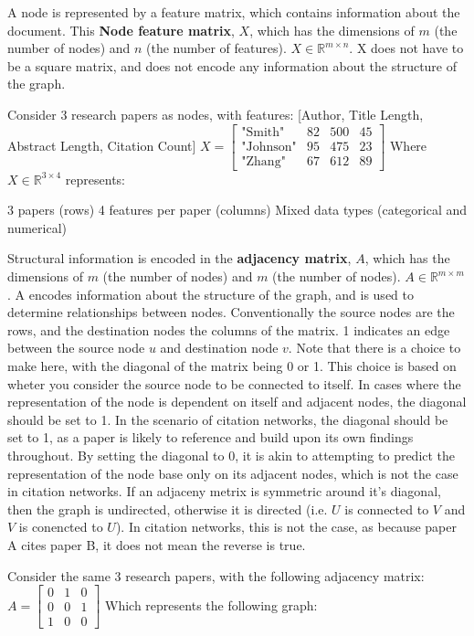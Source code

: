 \documentclass[../main.tex]{subfiles}
\begin{document}
  A node is represented by a feature matrix, which contains information about the document. This \textbf{Node feature matrix}, $X$, which has the dimensions of $m$ (the number of nodes) and $n$ (the number of features). $X \in \mathbb{R}^{m \times n}$. X does not have to be a square matrix, and does not encode any information about the structure of the graph. 

  Consider 3 research papers as nodes, with features: [Author, Title Length, Abstract Length, Citation Count]
  $X = \begin{bmatrix}
  \text{"Smith"} & 82 & 500 & 45 \\
  \text{"Johnson"} & 95 & 475 & 23 \\
  \text{"Zhang"} & 67 & 612 & 89
  \end{bmatrix}$
  Where $X \in \mathbb{R}^{3 \times 4}$ represents:
  
  3 papers (rows)
  4 features per paper (columns)
  Mixed data types (categorical and numerical)

  Structural information is encoded in the \textbf{adjacency matrix}, $A$, which has the dimensions of $m$ (the number of nodes) and $m$ (the number of nodes). $A \in \mathbb{R}^{m \times m}$. A encodes information about the structure of the graph, and is used to determine relationships between nodes. Conventionally the source nodes are the rows, and the destination nodes the columns of the matrix. 1 indicates an edge between the source node $u$ and destination node $v$. Note that there is a choice to make here, with the diagonal of the matrix being 0 or 1. This choice is based on wheter you consider the source node to be connected to itself. In cases where the representation of the node is dependent on itself and adjacent nodes, the diagonal should be set to 1. In the scenario of citation networks, the diagonal should be set to 1, as a paper is likely to reference and build upon its own findings throughout. By setting the diagonal to 0, it is akin to attempting to predict the representation of the node base only on its adjacent nodes, which is not the case in citation networks. If an adjaceny metrix is symmetric around it's diagonal, then the graph is undirected, otherwise it is directed (i.e. $U$ is connected to $V$ and $V$ is conencted to $U$). In citation networks, this is not the case, as because paper A cites paper B, it does not mean the reverse is true.    

  Consider the same 3 research papers, with the following adjacency matrix:
  $A = \begin{bmatrix}
  0 & 1 & 0 \\
  0 & 0 & 1 \\
  1 & 0 & 0
  \end{bmatrix}$
  Which represents the following graph:
\end{document}

